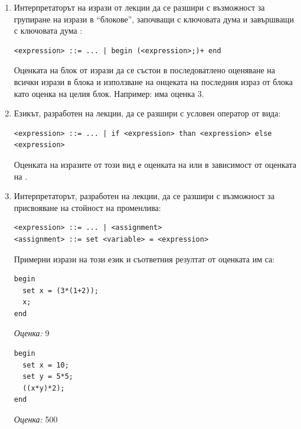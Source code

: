 \begin{enumerate}[]
	\item Интерпретаторът на изрази от лекции да се разшири с възможност за групиране на изрази в ``блокове'', започващи с ключовата дума  и завършващи с ключовата дума :
	\begin{flushleft}
	  \begin{lstlisting}[mathescape]
	<expression> ::= ... | begin (<expression>;)+ end
	  \end{lstlisting}
	\end{flushleft}
	
	Оценката на блок от изрази да се състои в последоватлено оценяване на всички изрази в блока и използване на онцеката на последния израз от блока като оценка на целия блок. Например:  има оценка $3$.
	
\item Езикът, разработен на лекции, да се разшири с условен оператор от вида:
\begin{flushleft}
  \begin{lstlisting}[mathescape]
<expression> ::= ... | if <expression> than <expression> else <expression>
  \end{lstlisting}
\end{flushleft}

Оценката на изразите от този вид е оценката на  или  в зависимост от оценката на .



\item Интерпретаторът, разработен на лекции, да се разшири с възможност за присвояване на стойност на променлива:

\begin{flushleft}
\begin{lstlisting}[mathescape]
<expression> ::= ... | <assignment>
<assignment> ::= set <variable> = <expression>
\end{lstlisting}
\end{flushleft}

Примерни изрази на този език и съответния резултат от оценката им са:

\begin{lstlisting}[mathescape]
begin
  set x = (3*(1+2));
  x;
end
\end{lstlisting}
\emph{Оценка:} 9

\begin{lstlisting}[mathescape]
begin
  set x = 10;
  set y = 5*5;
  ((x*y)*2);
end
\end{lstlisting}
\emph{Оценка:} 500



\end{enumerate}
